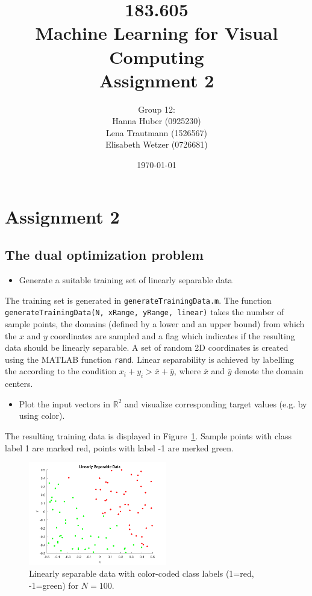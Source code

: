 \documentclass[a4]{article}
\title{\bf 183.605 \\ Machine Learning for Visual Computing \\ Assignment 2}
\author{Group 12: \\
	Hanna Huber (0925230) \\ Lena Trautmann (1526567) \\ Elisabeth Wetzer (0726681)}
\date{\today}
\begin{document}
\maketitle
\noindent

\section{Assignment 2}
\subsection{The dual optimization problem}

\begin{itemize}
\item Generate a suitable training set of linearly separable data
\end{itemize}
The training set is generated in \texttt{generateTrainingData.m}. The function \texttt{generateTrainingData(N, xRange, yRange, linear)} takes the number of sample points, the domains (defined by a lower and an upper bound) from which the $x$ and $y$ coordinates are sampled and a flag which indicates if the resulting data should be linearly separable. A set of random 2D coordinates is created using the MATLAB function \texttt{rand}. Linear separability is achieved by labelling the according to the condition $ x_i + y_i > \bar{x} + \bar{y}$, where $\bar{x}$ and $\bar{y}$ denote the domain centers.

\begin{itemize}
\item Plot the input vectors in $\mathbb{R}^2$ and visualize corresponding target values (e.g. by using color). 
\end{itemize}
The resulting training data is displayed in Figure~\ref{fig:linearData}. Sample points with class label 1 are marked red, points with label -1 are merked green.
\begin{figure}[!h]
	\begin{center}
		\centering
		\includegraphics[width=6cm]{../figures/linearData.pdf}
	\end{center}	
	\caption{Linearly separable data with color-coded class labels (1=red, -1=green) for $N=100$.}
	\label{fig:linearData}
\end{figure}
\end{document}
